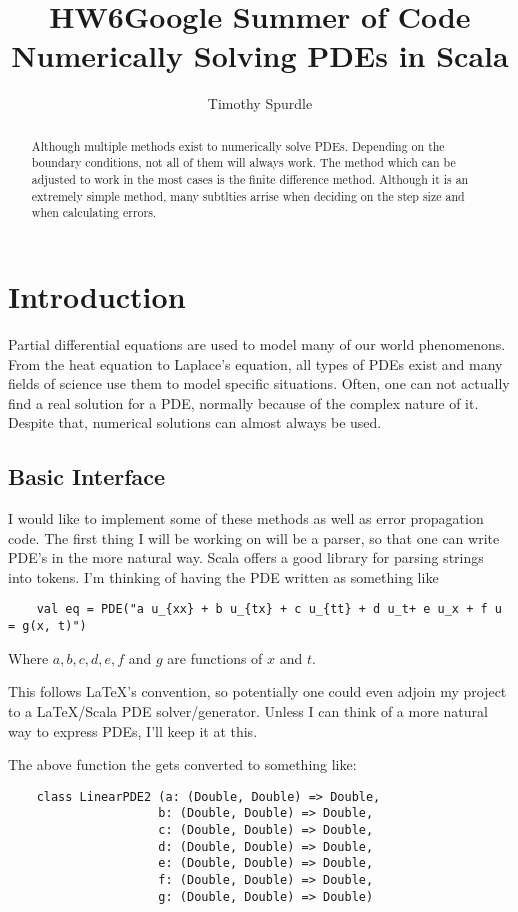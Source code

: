 
\title{HW6}
\usepackage{qtree}
\usepackage[mathscr]{euscript}
\usepackage{mathrsfs}
\title{Google Summer of Code\\
    Numerically Solving PDEs in Scala}
\author{Timothy Spurdle}
\date{}

\maketitle
\begin{abstract}
    Although multiple methods exist to numerically solve
    PDEs. Depending on the boundary conditions, not all of them will
    always work. The method which can be adjusted to work in the most
    cases is the finite difference method. Although it is an extremely
    simple method, many subtlties arrise when deciding on the step
    size and when calculating errors. 
\end{abstract}
\section{Introduction}
Partial differential equations are used to model many of our world
phenomenons. From the heat equation to Laplace's equation, all types
of PDEs exist and many fields of science use them to model specific
situations. Often, one can not actually find a real solution for a
PDE, normally because of the complex nature of it. Despite that,
numerical solutions can almost always be used.

\subsection{Basic Interface}
I would like to implement some of these methods as well as error
propagation code. The first thing I will be working on will be a
parser, so that one can write PDE's in the more natural way. Scala
offers a good library for parsing strings into tokens. I'm thinking of
having the PDE written as something like
\begin{verbatim}
    val eq = PDE("a u_{xx} + b u_{tx} + c u_{tt} + d u_t+ e u_x + f u = g(x, t)")
\end{verbatim}
Where $a, b, c, d, e, f$ and $g$ are functions of $x$ and $t$.

This follows \LaTeX's convention, so potentially one could even adjoin
my project to a \LaTeX/Scala PDE solver/generator. Unless I can think
of a more natural way to express PDEs, I'll keep it at this. 

The above function the gets converted to something like:
\begin{verbatim}
    class LinearPDE2 (a: (Double, Double) => Double,
                     b: (Double, Double) => Double, 
                     c: (Double, Double) => Double,
                     d: (Double, Double) => Double,
                     e: (Double, Double) => Double,
                     f: (Double, Double) => Double,
                     g: (Double, Double) => Double)
\end{verbatim}

